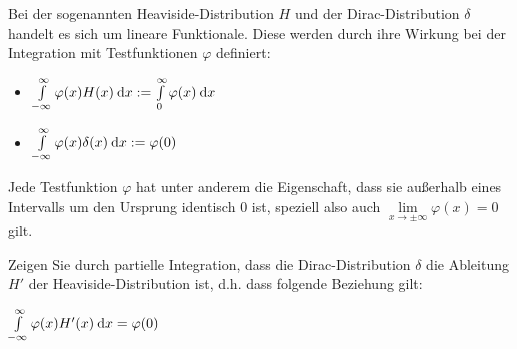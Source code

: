 Bei der sogenannten Heaviside-Distribution $H$ und der Dirac-Distribution $\delta$ handelt es sich um lineare Funktionale. Diese werden durch ihre Wirkung bei der Integration mit Testfunktionen $\varphi$ definiert:

\begin{itemize}
\item $\int\limits_{-\infty}^\infty \varphi(x) H(x) \:\mathrm{d}{x} := \int\limits_{0}^\infty \varphi(x) \:\mathrm{d}{x}$
\item $\int\limits_{-\infty}^\infty \varphi(x) \delta(x) \:\mathrm{d}{x} := \varphi(0)$
\end{itemize}

Jede Testfunktion $\varphi$ hat unter anderem die Eigenschaft, dass sie außerhalb eines Intervalls um den Ursprung identisch $0$ ist, speziell also auch $\lim\limits_{x\to\pm\infty} \varphi(x) = 0$ gilt.

Zeigen Sie durch partielle Integration, dass die Dirac-Distribution $\delta$ die Ableitung $H'$ der Heaviside-Distribution ist, d.h. dass folgende Beziehung gilt:

\bigskip
 
$\int\limits_{-\infty}^\infty \varphi(x) H'(x) \:\mathrm{d}{x} = \varphi(0)$
